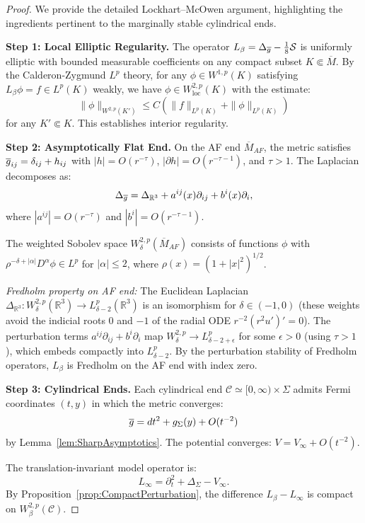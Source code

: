 \begin{proof}
We provide the detailed Lockhart--McOwen argument, highlighting the ingredients pertinent to the marginally stable cylindrical ends.

\medskip\noindent
\textbf{Step 1: Local Elliptic Regularity.}
The operator $L_\beta = \Delta_{\overline{g}} - \tfrac{1}{8}\mathcal{S}$ is uniformly elliptic with bounded measurable coefficients on any compact subset $K \Subset \overline{M}$. By the Calderon-Zygmund $L^p$ theory, for any $\phi \in W^{1,p}(K)$ satisfying $L_\beta \phi = f \in L^p(K)$ weakly, we have $\phi \in W^{2,p}_{\mathrm{loc}}(K)$ with the estimate:
\[
    \|\phi\|_{W^{2,p}(K')} \le C \left( \|f\|_{L^p(K)} + \|\phi\|_{L^p(K)} \right)
\]
for any $K' \Subset K$. This establishes interior regularity.

\medskip\noindent
\textbf{Step 2: Asymptotically Flat End.}
On the AF end $\overline{M}_{AF}$, the metric satisfies $\overline{g}_{ij} = \delta_{ij} + h_{ij}$ with $|h| = O(r^{-\tau})$, $|\partial h| = O(r^{-\tau-1})$, and $\tau > 1$. The Laplacian decomposes as:
\[
    \Delta_{\overline{g}} = \Delta_{\mathbb{R}^3} + a^{ij}(x) \partial_{ij} + b^i(x) \partial_i,
\]
where $|a^{ij}| = O(r^{-\tau})$ and $|b^i| = O(r^{-\tau-1})$.

The weighted Sobolev space $W^{2,p}_\delta(\overline{M}_{AF})$ consists of functions $\phi$ with $\rho^{-\delta+|\alpha|} D^\alpha \phi \in L^p$ for $|\alpha| \le 2$, where $\rho(x) = (1 + |x|^2)^{1/2}$.

\textit{Fredholm property on AF end:}
The Euclidean Laplacian $\Delta_{\mathbb{R}^3} : W^{2,p}_\delta(\mathbb{R}^3) \to L^p_{\delta-2}(\mathbb{R}^3)$ is an isomorphism for $\delta \in (-1, 0)$ (these weights avoid the indicial roots $0$ and $-1$ of the radial ODE $r^{-2}(r^2 u')' = 0$). The perturbation terms $a^{ij} \partial_{ij} + b^i \partial_i$ map $W^{2,p}_\delta \to L^p_{\delta-2+\epsilon}$ for some $\epsilon > 0$ (using $\tau > 1$), which embeds compactly into $L^p_{\delta-2}$. By the perturbation stability of Fredholm operators, $L_\beta$ is Fredholm on the AF end with index zero.

\medskip\noindent
\textbf{Step 3: Cylindrical Ends.}
Each cylindrical end $\mathcal{C}\simeq [0,\infty)\times\Sigma$ admits Fermi coordinates $(t, y)$ in which the metric converges:
\[
    \overline{g} = dt^2 + g_\Sigma(y) + O(t^{-2})
\]
by Lemma~\ref{lem:SharpAsymptotics}. The potential converges: $V = V_\infty + O(t^{-2})$.

The translation-invariant model operator is:
\[
    L_\infty = \partial_t^2 + \Delta_\Sigma - V_\infty.
\]
By Proposition~\ref{prop:CompactPerturbation}, the difference $L_\beta - L_\infty$ is compact on $W^{2,p}_\beta(\mathcal{C})$.


\end{proof}
